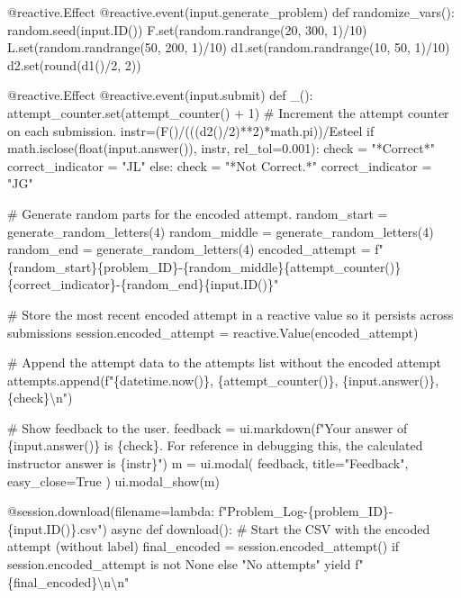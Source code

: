\documentclass[
  letterpaper,
  DIV=11,
  numbers=noendperiod]{scrreprt}
\newenvironment{Shaded}{\begin{snugshade}}{\end{snugshade}}
\newcommand{\NormalTok}[1]{\textcolor[rgb]{0.00,0.23,0.31}{#1}}
\begin{document}
\begin{Shaded}
\begin{Highlighting}[]
\NormalTok{    @reactive.Effect}
\NormalTok{    @reactive.event(input.generate\_problem)}
\NormalTok{    def randomize\_vars():}
\NormalTok{        random.seed(input.ID())}
\NormalTok{        F.set(random.randrange(20, 300, 1)/10)}
\NormalTok{        L.set(random.randrange(50, 200, 1)/10)}
\NormalTok{        d1.set(random.randrange(10, 50, 1)/10)}
\NormalTok{        d2.set(round(d1()/2, 2))}
        
\NormalTok{    @reactive.Effect}
\NormalTok{    @reactive.event(input.submit)}
\NormalTok{    def \_():}
\NormalTok{        attempt\_counter.set(attempt\_counter() + 1)  \# Increment the attempt counter on each submission.}
\NormalTok{        instr=(F()/(((d2()/2)**2)*math.pi))/Esteel}
\NormalTok{        if math.isclose(float(input.answer()), instr, rel\_tol=0.001):}
\NormalTok{            check = "*Correct*"}
\NormalTok{            correct\_indicator = "JL"}
\NormalTok{        else:}
\NormalTok{            check = "*Not Correct.*"}
\NormalTok{            correct\_indicator = "JG"}

\NormalTok{        \# Generate random parts for the encoded attempt.}
\NormalTok{        random\_start = generate\_random\_letters(4)}
\NormalTok{        random\_middle = generate\_random\_letters(4)}
\NormalTok{        random\_end = generate\_random\_letters(4)}
\NormalTok{        encoded\_attempt = f"\{random\_start\}\{problem\_ID\}{-}\{random\_middle\}\{attempt\_counter()\}\{correct\_indicator\}{-}\{random\_end\}\{input.ID()\}"}

\NormalTok{        \# Store the most recent encoded attempt in a reactive value so it persists across submissions}
\NormalTok{        session.encoded\_attempt = reactive.Value(encoded\_attempt)}

\NormalTok{        \# Append the attempt data to the attempts list without the encoded attempt}
\NormalTok{        attempts.append(f"\{datetime.now()\}, \{attempt\_counter()\}, \{input.answer()\}, \{check\}\textbackslash{}n")}

\NormalTok{        \# Show feedback to the user.}
\NormalTok{        feedback = ui.markdown(f"Your answer of \{input.answer()\} is \{check\}. For reference in debugging this, the calculated instructor answer is \{instr\}")}
\NormalTok{        m = ui.modal(}
\NormalTok{            feedback,}
\NormalTok{            title="Feedback",}
\NormalTok{            easy\_close=True}
\NormalTok{        )}
\NormalTok{        ui.modal\_show(m)}

\NormalTok{    @session.download(filename=lambda: f"Problem\_Log{-}\{problem\_ID\}{-}\{input.ID()\}.csv")}
\NormalTok{    async def download():}
\NormalTok{        \# Start the CSV with the encoded attempt (without label)}
\NormalTok{        final\_encoded = session.encoded\_attempt() if session.encoded\_attempt is not None else "No attempts"}
\NormalTok{        yield f"\{final\_encoded\}\textbackslash{}n\textbackslash{}n"}
        

\end{Highlighting}
\end{Shaded}
\end{document}
